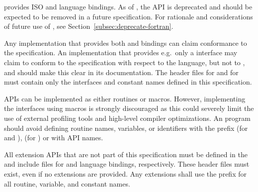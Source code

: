 \openshmem provides ISO \Cstd and \Fortran[90] language bindings.
As of \openshmem[1.4], the \Fortran API is deprecated and should be expected
to be removed in a future specification. For rationale and considerations of
future \Fortran use of \openshmem, see Section~\ref{subsec:deprecate-fortran}.

Any implementation that provides both \Cstd and \Fortran bindings can claim
conformance to the specification. An implementation that provides e.g.\ only a
\Cstd interface may claim to conform to the \openshmem specification with
respect to the \Cstd language, but not to \Fortran, and should make this
clear in its documentation. The \openshmem header files  for
\Cstd and  for
\Fortran must contain only the interfaces and constant names defined in this
specification.

\openshmem \acp{API} can be implemented as either routines or macros. However,
implementing the interfaces using macros is strongly discouraged as this could
severely limit the use of external profiling tools and high-level compiler
optimizations. An \openshmem program should avoid defining routine names,
variables, or identifiers with the prefix \shmemprefix (for \Cstd and
\Fortran), \shmemprefixC (for \Cstd) or with \openshmem \ac{API} names.

All \openshmem extension \acp{API} that are not part of this specification must
be defined in the  and  include files for
\Cstd and \Fortran language bindings, respectively.  These header files
must exist, even if no extensions are provided.  Any extensions shall use the
 prefix for all routine, variable, and constant names.
